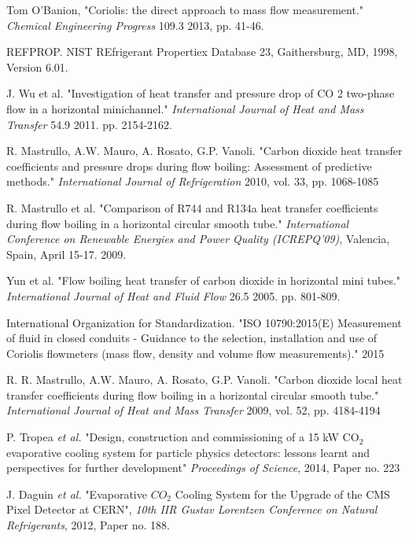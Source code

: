 \documentclass{report}
\begin{document}
\begin{thebibliography}{9}
Tom O'Banion,  "Coriolis: the direct approach to mass flow measurement." \textit{Chemical Engineering Progress} 109.3 2013, pp. 41-46.

REFPROP. NIST REfrigerant Propertiex Database 23, Gaithersburg, MD, 1998, Version 6.01.

J. Wu et al. "Investigation of heat transfer and pressure drop of CO 2 two-phase flow in a horizontal minichannel." \textit{International Journal of Heat and Mass Transfer} 54.9 2011. pp. 2154-2162.

R. Mastrullo, A.W. Mauro, A. Rosato, G.P. Vanoli. "Carbon dioxide heat transfer coefficients and pressure drops during flow boiling: Assessment of predictive methods." \textit{International Journal of Refrigeration} 2010, vol. 33, pp. 1068-1085

R. Mastrullo et al. "Comparison of R744 and R134a heat transfer coefficients during flow boiling in a horizontal circular smooth tube." \textit{International Conference on Renewable Energies and Power Quality (ICREPQ’09)}, Valencia, Spain, April 15-17. 2009.

Yun et al. "Flow boiling heat transfer of carbon dioxide in horizontal mini tubes." \textit{International Journal of Heat and Fluid Flow} 26.5 2005. pp. 801-809.

International Organization for Standardization. "ISO 10790:2015(E) Measurement of fluid in closed conduits - Guidance to the selection, installation and use of Coriolis flowmeters (mass flow, density and volume flow measurements)." 2015

R. R. Mastrullo, A.W. Mauro, A. Rosato, G.P. Vanoli. "Carbon dioxide local heat transfer coefficients during flow boiling in a horizontal circular smooth tube." \textit{International Journal of Heat and Mass Transfer} 2009, vol. 52, pp. 4184-4194

P. Tropea \textit{et al.} "Design, construction and commissioning of a 15 kW CO$_2$ evaporative cooling system for particle physics detectors: lessons learnt and perspectives for further development" \textit{Proceedings of Science}, 2014, Paper no. 223

J. Daguin \textit{et al.} "Evaporative $CO_2$ Cooling System for the Upgrade of the CMS Pixel Detector at CERN", \textit{10th IIR Gustav Lorentzen Conference on Natural Refrigerants}, 2012, Paper no. 188.


\end{thebibliography}
\end{document}
